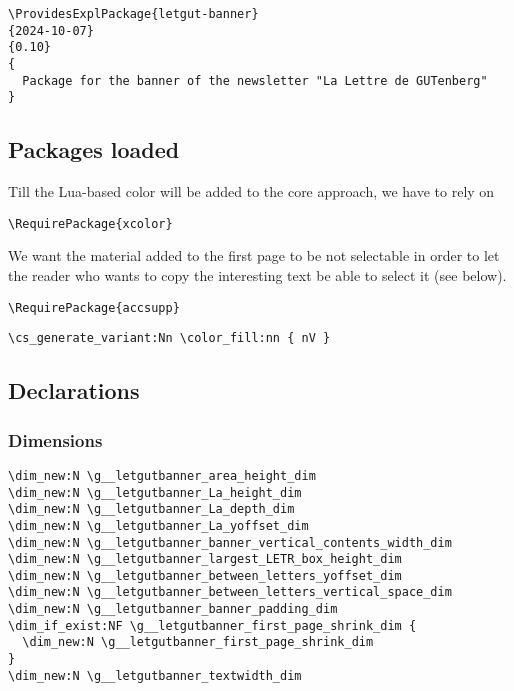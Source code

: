 \documentclass{letgut}
\begin{document}
\begin{lstlisting}
\ProvidesExplPackage{letgut-banner}
{2024-10-07}
{0.10}
{
  Package for the banner of the newsletter "La Lettre de GUTenberg"
}
\end{lstlisting}

\subsection{Packages loaded}
\label{ImplementationPackagesloaded-etvgxqt0fck0}
Till the Lua-based color will be  added to the core  approach,
we have to rely on 

\begin{lstlisting}
\RequirePackage{xcolor}
\end{lstlisting}

We want the material added to the first page to be not selectable in order to let the
reader who wants to copy the interesting text be able to select it (see below).

\begin{lstlisting}
\RequirePackage{accsupp}
\end{lstlisting}

\begin{lstlisting}
\cs_generate_variant:Nn \color_fill:nn { nV }
\end{lstlisting}

\subsection{Declarations}
\label{ImplementationDeclarations-u0ygxqt0fck0}
\subsubsection{Dimensions}
\label{ImplementationDeclarationsDimensions-9t0hxqt0fck0}
\begin{lstlisting}
\dim_new:N \g__letgutbanner_area_height_dim
\dim_new:N \g__letgutbanner_La_height_dim
\dim_new:N \g__letgutbanner_La_depth_dim
\dim_new:N \g__letgutbanner_La_yoffset_dim
\dim_new:N \g__letgutbanner_banner_vertical_contents_width_dim
\dim_new:N \g__letgutbanner_largest_LETR_box_height_dim
\dim_new:N \g__letgutbanner_between_letters_yoffset_dim
\dim_new:N \g__letgutbanner_between_letters_vertical_space_dim
\dim_new:N \g__letgutbanner_banner_padding_dim
\dim_if_exist:NF \g__letgutbanner_first_page_shrink_dim {
  \dim_new:N \g__letgutbanner_first_page_shrink_dim
}
\dim_new:N \g__letgutbanner_textwidth_dim
\end{lstlisting}
\end{document}
